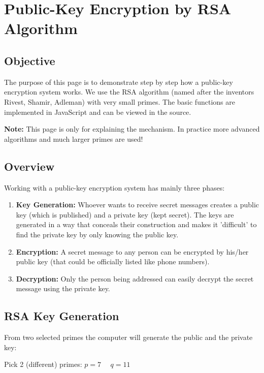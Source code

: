 \documentclass{article}
\begin{document}

\section*{Public-Key Encryption by RSA Algorithm}

\subsection*{Objective}
The purpose of this page is to demonstrate step by step how a public-key encryption system works. We use the RSA algorithm (named after the inventors Rivest, Shamir, Adleman) with very small primes. The basic functions are implemented in JavaScript and can be viewed in the source.

\textbf{Note:} This page is only for explaining the mechanism. In practice more advanced algorithms and much larger primes are used!

\subsection*{Overview}
Working with a public-key encryption system has mainly three phases:

\begin{enumerate}
    \item \textbf{Key Generation:} Whoever wants to receive secret messages creates a public key (which is published) and a private key (kept secret). The keys are generated in a way that conceals their construction and makes it 'difficult' to find the private key by only knowing the public key.
    \item \textbf{Encryption:} A secret message to any person can be encrypted by his/her public key (that could be officially listed like phone numbers).
    \item \textbf{Decryption:} Only the person being addressed can easily decrypt the secret message using the private key.
\end{enumerate}

\subsection*{RSA Key Generation}
From two selected primes the computer will generate the public and the private key:

Pick 2 (different) primes: $p = 7$ $\quad q = 11$ \vspace{10mm}
\end{document}
